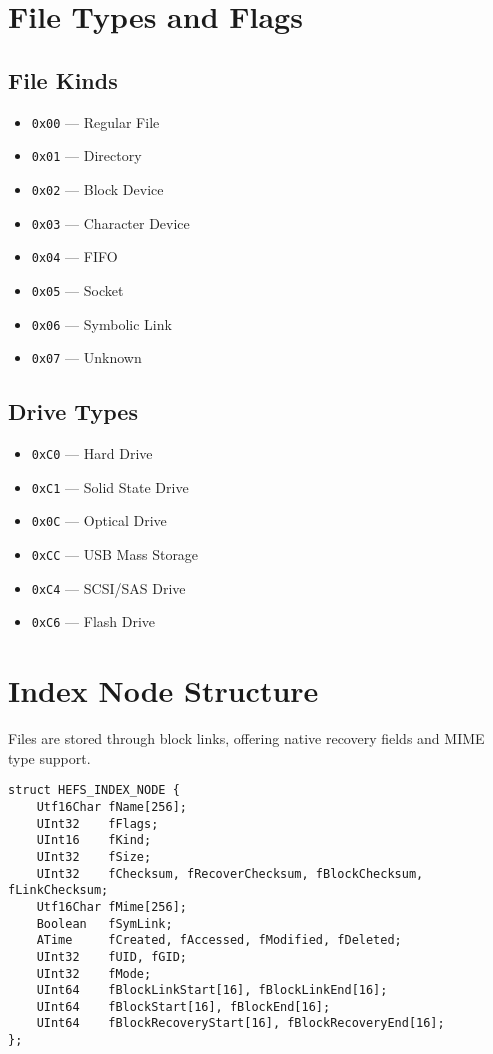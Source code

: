 \documentclass{article}
\begin{document}
\section{File Types and Flags}
\subsection*{File Kinds}
\begin{itemize}[label=--]
    \item \verb|0x00| --- Regular File
    \item \verb|0x01| --- Directory
    \item \verb|0x02| --- Block Device
    \item \verb|0x03| --- Character Device
    \item \verb|0x04| --- FIFO
    \item \verb|0x05| --- Socket
    \item \verb|0x06| --- Symbolic Link
    \item \verb|0x07| --- Unknown
\end{itemize}

\subsection*{Drive Types}
\begin{itemize}[label=--]
    \item \verb|0xC0| --- Hard Drive
    \item \verb|0xC1| --- Solid State Drive
    \item \verb|0x0C| --- Optical Drive
    \item \verb|0xCC| --- USB Mass Storage
    \item \verb|0xC4| --- SCSI/SAS Drive
    \item \verb|0xC6| --- Flash Drive
\end{itemize}

\section{Index Node Structure}
Files are stored through block links, offering native recovery fields and MIME type support.

\begin{lstlisting}[style=cstyle, caption={HEFS\_INDEX\_NODE structure}]
struct HEFS_INDEX_NODE {
    Utf16Char fName[256];
    UInt32    fFlags;
    UInt16    fKind;
    UInt32    fSize;
    UInt32    fChecksum, fRecoverChecksum, fBlockChecksum, fLinkChecksum;
    Utf16Char fMime[256];
    Boolean   fSymLink;
    ATime     fCreated, fAccessed, fModified, fDeleted;
    UInt32    fUID, fGID;
    UInt32    fMode;
    UInt64    fBlockLinkStart[16], fBlockLinkEnd[16];
    UInt64    fBlockStart[16], fBlockEnd[16];
    UInt64    fBlockRecoveryStart[16], fBlockRecoveryEnd[16];
};
\end{lstlisting}
\end{document}
